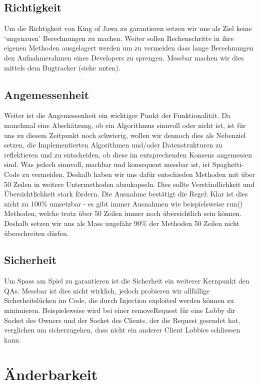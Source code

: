 \documentclass{scrartcl}
\begin{document}
\subsection{Richtigkeit}
Um die Richtigkeit von King of Jawa zu garantieren setzen wir uns als Ziel keine ‘ungenauen’ Berechnungen zu machen. Weiter sollen Rechenschritte in ihre eigenen Methoden ausgelagert werden um zu vermeiden dass lange Berechnungen den Aufnahmerahmen eines Developers zu sprengen. Messbar machen wir dies mittels dem Bugtracker (siehe unten). 

\subsection{Angemessenheit}
Weiter ist die Angemessenheit ein wichtiger Punkt der Funktionalität. Da manchmal eine Abschätzung, ob ein Algorithmus sinnvoll oder nicht ist, ist  für uns zu diesem Zeitpunkt noch schwierig, wollen wir dennoch dies als Nebenziel setzen, die Implementierten Algorithmen und/oder Datenstrukturen zu reflektieren und zu entscheiden, ob diese im entsprechenden Konsens angemessen sind. Was jedoch sinnvoll, machbar und konsequent messbar ist, ist Spaghetti-Code zu vermeiden. Deshalb haben wir uns dafür entschieden Methoden mit über 50 Zeilen in weitere Untermethoden abzukapseln. Dies sollte Verständlichkeit und Übersichtlichkeit stark fördern. Die Ausnahme bestätigt die Regel: Klar ist dies nicht zu 100\% umsetzbar - es gibt immer Ausnahmen wie beispielsweise run() Methoden, welche trotz über 50 Zeilen immer noch übersichtlich sein können. Deshalb setzen wir uns als Mass ungefähr 90\% der Methoden 50 Zeilen nicht überschreiten dürfen.

\subsection{Sicherheit}
Um Spass am Spiel zu garantieren ist die Sicherheit ein weiterer Kernpunkt den QAs. Messbar ist dies nicht wirklich, jedoch probieren wir allfällige Sicherheitslücken im Code, die durch Injection exploited werden können zu minimieren. Beispielsweise wird bei einer removeRequest für eine Lobby dir Socket des Owners und der Socket des Clients, der die Request gesendet hat, verglichen um sicherzugehen, dass nicht ein anderer Client Lobbies schliessen kann.

\section{Änderbarkeit}
\end{document}
